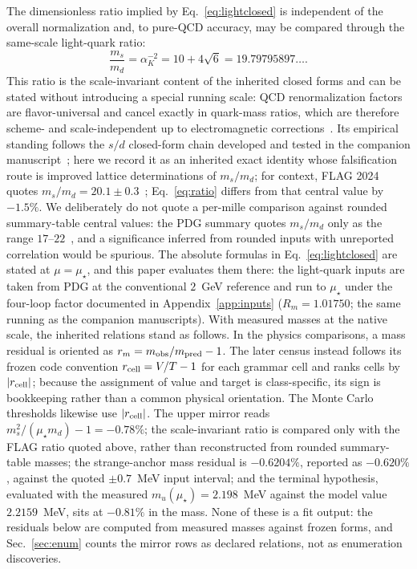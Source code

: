 \documentclass[aps,twocolumn,superscriptaddress,nofootinbib,floatfix]{revtex4-2}
\newcommand{\mstar}{\mu_\star}
\newcommand{\alphaK}{\alpha_K}
\begin{document}
The dimensionless ratio implied by Eq.~\eqref{eq:lightclosed} is independent of the overall normalization and, to pure-QCD accuracy, may be compared through the same-scale light-quark ratio:
\begin{equation}
\boxed{\frac{m_s}{m_d}=\alphaK^{-2}=10+4\sqrt6=19.79795897\ldots.}
\label{eq:ratio}
\end{equation}
This ratio is the scale-invariant content of the inherited closed forms and can be stated without introducing a special running scale: QCD renormalization factors are flavor-universal and cancel exactly in quark-mass ratios, which are therefore scheme- and scale-independent up to electromagnetic corrections~\cite{GasserLeutwyler1982,PDG2026}. Its empirical standing follows the $s/d$ closed-form chain developed and tested in the companion manuscript~\cite{BrilliantMPLA}; here we record it as an inherited exact identity whose falsification route is improved lattice determinations of $m_s/m_d$; for context, FLAG 2024 quotes $m_s/m_d=20.1\pm0.3$~\cite{FLAG2024}; Eq.~\eqref{eq:ratio} differs from that central value by $-1.5\%$. We deliberately do not quote a per-mille comparison against rounded summary-table central values: the PDG summary quotes $m_s/m_d$ only as the range $17$--$22$~\cite{PDG2026}, and a significance inferred from rounded inputs with unreported correlation would be spurious. The absolute formulas in Eq.~\eqref{eq:lightclosed} are stated at $\mu=\mstar$, and this paper evaluates them there: the light-quark inputs are taken from PDG at the conventional $2$~GeV reference and run to $\mstar$ under the four-loop factor documented in Appendix~\ref{app:inputs} ($R_m=1.01750$; the same running as the companion manuscripts). With measured masses at the native scale, the inherited relations stand as follows. In the physics comparisons, a mass residual is oriented as $r_m=m_{\rm obs}/m_{\rm pred}-1$. The later census instead follows its frozen code convention $r_{\rm cell}=V/T-1$ for each grammar cell and ranks cells by $|r_{\rm cell}|$; because the assignment of value and target is class-specific, its sign is bookkeeping rather than a common physical orientation. The Monte Carlo thresholds likewise use $|r_{\rm cell}|$. The upper mirror reads $m_s^2/(\mstar m_d)-1=-0.78\%$; the scale-invariant ratio is compared only with the FLAG ratio quoted above, rather than reconstructed from rounded summary-table masses; the strange-anchor mass residual is $-0.6204\%$, reported as $-0.620\%$, against the quoted $\pm0.7$~MeV input interval; and the terminal hypothesis, evaluated with the measured $m_u(\mstar)=2.198$~MeV against the model value $2.2159$~MeV, sits at $-0.81\%$ in the mass. None of these is a fit output: the residuals below are computed from measured masses against frozen forms, and Sec.~\ref{sec:enum} counts the mirror rows as declared relations, not as enumeration discoveries.
\end{document}
